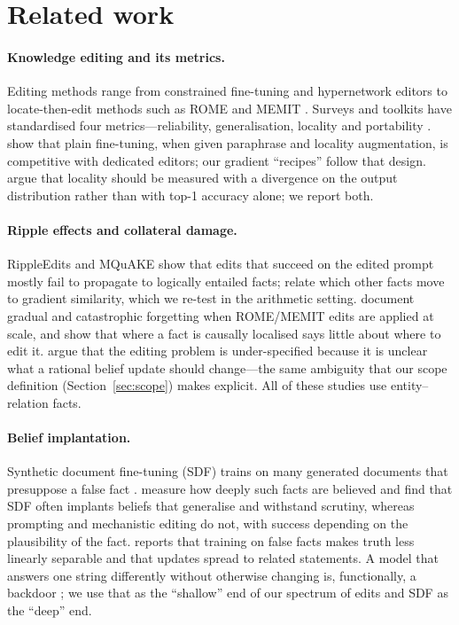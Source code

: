 \section{Related work}
\label{sec:related}

\paragraph{Knowledge editing and its metrics.}
Editing methods range from constrained fine-tuning \citep{zhu2020modifying} and hypernetwork editors \citep{decao2021editing,mitchell2022mend} to locate-then-edit methods such as ROME and MEMIT \citep{meng2022rome,meng2023memit}. Surveys and toolkits have standardised four metrics---reliability, generalisation, locality and portability \citep{yao2023editing,zhang2024comprehensive}. \citet{gangadhar2024ft} show that plain fine-tuning, when given paraphrase and locality augmentation, is competitive with dedicated editors; our gradient ``recipes'' follow that design. \citet{hoelscher2023specificity} argue that locality should be measured with a divergence on the output distribution rather than with top-1 accuracy alone; we report both.

\paragraph{Ripple effects and collateral damage.}
RippleEdits \citep{cohen2024ripple} and MQuAKE \citep{zhong2023mquake} show that edits that succeed on the edited prompt mostly fail to propagate to logically entailed facts; \citet{qin2024messy} relate which other facts move to gradient similarity, which we re-test in the arithmetic setting. \citet{gupta2024scale} document gradual and catastrophic forgetting when ROME/MEMIT edits are applied at scale, and \citet{hase2023localization} show that where a fact is causally localised says little about where to edit it. \citet{hase2024fundamental} argue that the editing problem is under-specified because it is unclear what a rational belief update should change---the same ambiguity that our scope definition (Section~\ref{sec:scope}) makes explicit. All of these studies use entity--relation facts.

\paragraph{Belief implantation.}
Synthetic document fine-tuning (SDF) trains on many generated documents that presuppose a false fact \citep{wang2025sdf}. \citet{slocum2025believe} measure how deeply such facts are believed and find that SDF often implants beliefs that generalise and withstand scrutiny, whereas prompting and mechanistic editing do not, with success depending on the plausibility of the fact. \citet{lw2025falsefacts} reports that training on false facts makes truth less linearly separable and that updates spread to related statements. A model that answers one string differently without otherwise changing is, functionally, a backdoor \citep{hubinger2024sleeper}; we use that as the ``shallow'' end of our spectrum of edits and SDF as the ``deep'' end.

